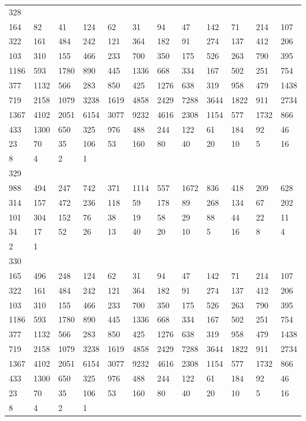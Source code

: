 \begin{longtable}{llllllllllll}
328&&&&&&&&&&&\\
164& 82& 41& 124& 62& 31& 94& 47& 142& 71& 214& 107\\
322& 161& 484& 242& 121& 364& 182& 91& 274& 137& 412& 206\\
103& 310& 155& 466& 233& 700& 350& 175& 526& 263& 790& 395\\
1186& 593& 1780& 890& 445& 1336& 668& 334& 167& 502& 251& 754\\
377& 1132& 566& 283& 850& 425& 1276& 638& 319& 958& 479& 1438\\
719& 2158& 1079& 3238& 1619& 4858& 2429& 7288& 3644& 1822& 911& 2734\\
1367& 4102& 2051& 6154& 3077& 9232& 4616& 2308& 1154& 577& 1732& 866\\
433& 1300& 650& 325& 976& 488& 244& 122& 61& 184& 92& 46\\
23& 70& 35& 106& 53& 160& 80& 40& 20& 10& 5& 16\\
8& 4& 2& 1& \\

329&&&&&&&&&&&\\
988& 494& 247& 742& 371& 1114& 557& 1672& 836& 418& 209& 628\\
314& 157& 472& 236& 118& 59& 178& 89& 268& 134& 67& 202\\
101& 304& 152& 76& 38& 19& 58& 29& 88& 44& 22& 11\\
34& 17& 52& 26& 13& 40& 20& 10& 5& 16& 8& 4\\
2& 1& \\

330&&&&&&&&&&&\\
165& 496& 248& 124& 62& 31& 94& 47& 142& 71& 214& 107\\
322& 161& 484& 242& 121& 364& 182& 91& 274& 137& 412& 206\\
103& 310& 155& 466& 233& 700& 350& 175& 526& 263& 790& 395\\
1186& 593& 1780& 890& 445& 1336& 668& 334& 167& 502& 251& 754\\
377& 1132& 566& 283& 850& 425& 1276& 638& 319& 958& 479& 1438\\
719& 2158& 1079& 3238& 1619& 4858& 2429& 7288& 3644& 1822& 911& 2734\\
1367& 4102& 2051& 6154& 3077& 9232& 4616& 2308& 1154& 577& 1732& 866\\
433& 1300& 650& 325& 976& 488& 244& 122& 61& 184& 92& 46\\
23& 70& 35& 106& 53& 160& 80& 40& 20& 10& 5& 16\\
8& 4& 2& 1& \\


\end{longtable}
